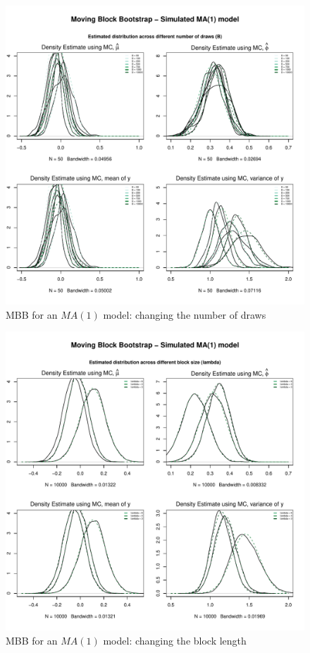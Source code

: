 \documentclass{article}
\begin{document}
\begin{figure}[hbt!]
\includegraphics[width=\textwidth]{plots/MBB_MA1_densities_diff_drawsB}
\caption{MBB for an $MA(1)$ model: changing the number of draws}
\label{fig:MBB_MA1_densities_diff_drawsB}
\centering
\end{figure}

\begin{figure}[hbt!]
\includegraphics[width=\textwidth]{plots/MBB_MA1_densities_diff_blocklength}
\caption{MBB for an $MA(1)$ model: changing the block length}
\label{fig:MBB_MA1_densities_diff_blocklength}
\centering
\end{figure}
\end{document}
